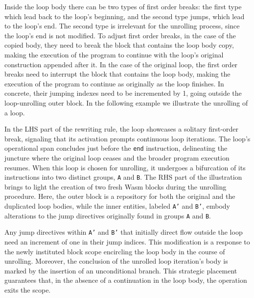 Inside the loop body there can be two types of first order breaks: the first type which lead back to the loop's beginning, and the second type jumps, which lead to the loop's end.
The second type is irrelevant for the unrolling process, since the loop's end is not modified.
To adjust first order breaks, in the case of the copied body, they need to break the \wasm block that contains the loop body copy, making the execution of the program to continue with the loop's original construction appended after it.
In the case of the original loop, the first order breaks need to interrupt the block that contains the loop body, making the execution of the program to continue as originally as the loop finishes.
In concrete, their jumping indexes need to be incremented by 1, going outside the loop-unrolling outer \wasm block.
In the following example we illustrate the unrolling of a loop.



In the LHS part of the rewriting rule, the loop showcases a solitary first-order break, signaling that its activation prompts continuous loop iterations. 
The loop's operational span concludes just before the \texttt{end} instruction, delineating the juncture where the original loop ceases and the broader program execution resumes.
When this loop is chosen for unrolling, it undergoes a bifurcation of its instructions into two distinct groups, \texttt{A} and \texttt{B}. 
The RHS part of the illustration brings to light the creation of two fresh Wasm blocks during the unrolling procedure. 
Here, the outer block is a repository for both the original and the duplicated loop bodies, while the inner entities, labeled \texttt{A'} and \texttt{B'}, embody alterations to the jump directives originally found in groups \texttt{A} and \texttt{B}.

Any jump directives within \texttt{A'} and \texttt{B'} that initially direct flow outside the loop need an increment of one in their jump indices. 
This modification is a response to the newly instituted block scope encircling the loop body in the course of unrolling. 
Moreover, the conclusion of the unrolled loop iteration's body is marked by the insertion of an unconditional branch. 
This strategic placement guarantees that, in the absence of a continuation in the loop body, the operation exits the scope.



